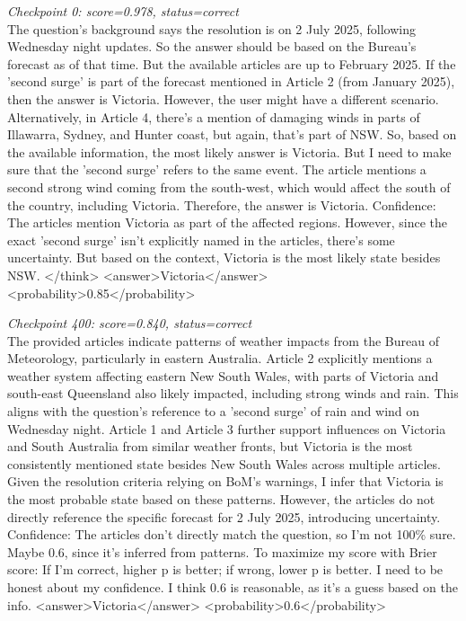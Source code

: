 \noindent\textit{Checkpoint 0: score=0.978, status=correct}\\
The question's background says the resolution is on 2 July 2025, following Wednesday night updates. So the answer should be based on the Bureau's forecast as of that time. But the available articles are up to February 2025. If the 'second surge' is part of the forecast mentioned in Article 2 (from January 2025), then the answer is Victoria. However, the user might have a different scenario. Alternatively, in Article 4, there's a mention of damaging winds in parts of Illawarra, Sydney, and Hunter coast, but again, that's part of NSW. So, based on the available information, the most likely answer is Victoria. But I need to make sure that the 'second surge' refers to the same event. The article mentions a second strong wind coming from the south-west, which would affect the south of the country, including Victoria. Therefore, the answer is Victoria. Confidence: The articles mention Victoria as part of the affected regions. However, since the exact 'second surge' isn't explicitly named in the articles, there's some uncertainty. But based on the context, Victoria is the most likely state besides NSW. </think> <answer>Victoria</answer> <probability>0.85</probability>

\medskip

\noindent\textit{Checkpoint 400: score=0.840, status=correct}\\
The provided articles indicate patterns of weather impacts from the Bureau of Meteorology, particularly in eastern Australia. Article 2 explicitly mentions a weather system affecting eastern New South Wales, with parts of Victoria and south-east Queensland also likely impacted, including strong winds and rain. This aligns with the question's reference to a 'second surge' of rain and wind on Wednesday night. Article 1 and Article 3 further support influences on Victoria and South Australia from similar weather fronts, but Victoria is the most consistently mentioned state besides New South Wales across multiple articles. Given the resolution criteria relying on BoM's warnings, I infer that Victoria is the most probable state based on these patterns. However, the articles do not directly reference the specific forecast for 2 July 2025, introducing uncertainty. Confidence: The articles don't directly match the question, so I'm not 100\% sure. Maybe 0.6, since it's inferred from patterns. To maximize my score with Brier score: If I'm correct, higher p is better; if wrong, lower p is better. I need to be honest about my confidence. I think 0.6 is reasonable, as it's a guess based on the info. <answer>Victoria</answer> <probability>0.6</probability>

